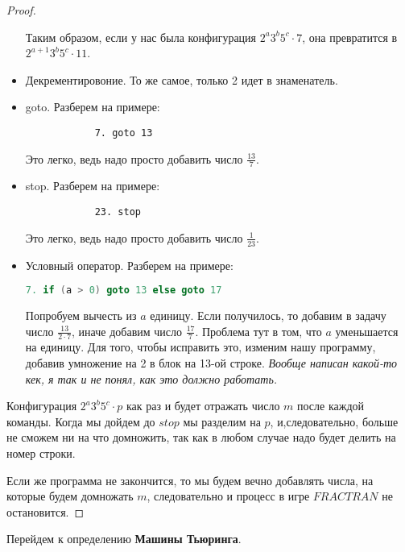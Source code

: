 \begin{proof}
\begin{itemize}
        Таким образом, если у нас была конфигурация $2^a3^b5^c \cdot 7$, она превратится в $2^{a+1}3^b5^c \cdot 11$.
        \item Декрементировоние. То же самое, только 2 идет в знаменатель.
        \item goto. Разберем на примере: \begin{lstlisting}
            7. goto 13
        \end{lstlisting}
        Это легко, ведь надо просто добавить число $\frac{13}{7}$.
        \item stop. Разберем на примере: \begin{lstlisting}
            23. stop
        \end{lstlisting}
        Это легко, ведь надо просто добавить число $\frac{1}{23}$.
        \item Условный оператор. Разберем на примере: \begin{lstlisting}[language=c++]
            7. if (a > 0) goto 13 else goto 17
        \end{lstlisting}
        Попробуем вычесть из $a$ единицу. Если получилось, то добавим в задачу число $\frac{13}{2 \cdot 7}$, иначе добавим число $\frac{17}{7}$. Проблема тут в том, что $a$ уменьшается на единицу. Для того, чтобы исправить это, изменим нашу программу, добавив умножение на 2 в блок на 13-ой строке.
        \textit{Вообще написан какой-то кек, я так и не понял, как это должно работать.}
    \end{itemize}
    Конфигурация $2^a3^b5^c \cdot p$ как раз и будет отражать число $m$ после каждой команды. Когда мы дойдем до $stop$ мы разделим на $p$, и,следовательно, больше не сможем ни на что домножить, так как в любом случае надо будет делить на номер строки. 

    Если же программа не закончится, то мы будем вечно добавлять числа, на которые будем домножать $m$, следовательно и процесс в игре $FRACTRAN$ не остановится. 
\end{proof}

\vspace{5mm}

Перейдем к определению \textbf{Машины Тьюринга}.


